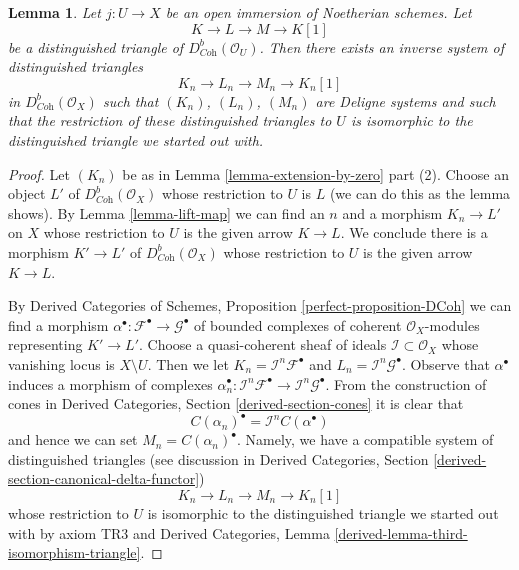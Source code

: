 \documentclass[10pt,a4paper]{amsart}
\theoremstyle{plain}
\newtheorem{lemma}[subsection]{Lemma}
\theoremstyle{definition}
\theoremstyle{remark}
\numberwithin{equation}{subsection}
\begin{document}
\begin{lemma}
\label{lemma-extension-by-zero-triangle}
Let $j : U \to X$ be an open immersion of Noetherian schemes. Let
$$
K \to L \to M \to K[1]
$$
be a distinguished triangle of $D^b_{\textit{Coh}}(\mathcal{O}_U)$.
Then there exists an inverse system of distinguished triangles
$$
K_n \to L_n \to M_n \to K_n[1]
$$
in $D^b_{\textit{Coh}}(\mathcal{O}_X)$ such that $(K_n)$, $(L_n)$, $(M_n)$
are Deligne systems and such that the restriction of these
distinguished triangles to $U$ is isomorphic to the distinguished triangle
we started out with.
\end{lemma}

\begin{proof}
Let $(K_n)$ be as in Lemma \ref{lemma-extension-by-zero} part (2).
Choose an object $L'$ of $D^b_{\textit{Coh}}(\mathcal{O}_X)$
whose restriction to $U$ is $L$ (we can do this as the lemma shows).
By Lemma \ref{lemma-lift-map} we can find an $n$ and a morphism
$K_n \to L'$ on $X$ whose restriction to $U$ is the given arrow
$K \to L$. We conclude there is a morphism $K' \to L'$ of
$D^b_{\textit{Coh}}(\mathcal{O}_X)$ whose restriction to $U$
is the given arrow $K \to L$.

\medskip\noindent
By Derived Categories of Schemes, Proposition \ref{perfect-proposition-DCoh}
we can find a morphism $\alpha^\bullet : \mathcal{F}^\bullet \to
\mathcal{G}^\bullet$ of bounded complexes
of coherent $\mathcal{O}_X$-modules representing $K' \to L'$.
Choose a quasi-coherent sheaf of ideals $\mathcal{I} \subset \mathcal{O}_X$
whose vanishing locus is $X \setminus U$.
Then we let
$K_n = \mathcal{I}^n\mathcal{F}^\bullet$
and
$L_n = \mathcal{I}^n\mathcal{G}^\bullet$.
Observe that $\alpha^\bullet$ induces a morphism of
complexes $\alpha_n^\bullet : \mathcal{I}^n\mathcal{F}^\bullet \to
\mathcal{I}^n\mathcal{G}^\bullet$. From the construction of cones in
Derived Categories, Section \ref{derived-section-cones}
it is clear that
$$
C(\alpha_n)^\bullet = \mathcal{I}^nC(\alpha^\bullet)
$$
and hence we can set $M_n = C(\alpha_n)^\bullet$. Namely, we
have a compatible system of distinguished triangles
(see discussion in Derived Categories, Section
\ref{derived-section-canonical-delta-functor})
$$
K_n \to L_n \to M_n \to K_n[1]
$$
whose restriction to $U$ is isomorphic to the distinguished 
triangle we started out with by axiom TR3 and Derived Categories,
Lemma \ref{derived-lemma-third-isomorphism-triangle}.
\end{proof}
\end{document}
